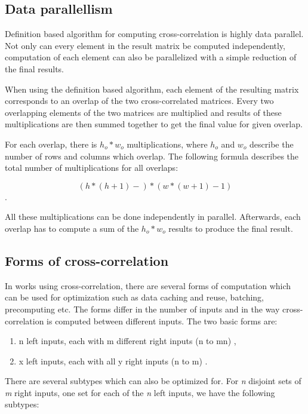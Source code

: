 \subsection{Data parallellism}
Definition based algorithm for computing cross-correlation is highly data parallel. Not only can every element in the result matrix be computed independently, computation of each element can also be parallelized with a simple reduction of the final results.

When using the definition based algorithm, each element of the resulting matrix corresponds to an overlap of the two cross-correlated matrices. Every two overlapping elements of the two matrices are multiplied and results of these multiplications are then summed together to get the final value for given overlap.

For each overlap, there is $h_o * w_o$ multiplications, where $h_o$ and $w_o$ describe the number of rows and columns which overlap. The following formula describes the total number of multiplications for all overlaps:

\[
	(h*(h+1)-)*(w*(w+1)-1)
\].

All these multiplications can be done independently in parallel. Afterwards, each overlap has to compute a sum of the $h_o * w_o$ results to produce the final result.



\subsection{Forms of cross-correlation}

In works using cross-correlation, there are several forms of computation which can be used for optimization such as data caching and reuse, batching, precomputing etc. The forms differ in the number of inputs and in the way cross-correlation is computed between different inputs. 
The two basic forms are:

\begin{enumerate}
	\item n left inputs, each with m different right inputs (n to mn) \citet{misko} \citet{zhang2015} \citet{Kapinchev2015}, 
	\item x left inputs, each with all y right inputs (n to m) \citet{Clark2011}.
\end{enumerate} 

There are several subtypes which can also be optimized for. For \textit{n} disjoint sets of \textit{m} right inputs, one set for each of the \textit{n} left inputs, we have the following subtypes:

